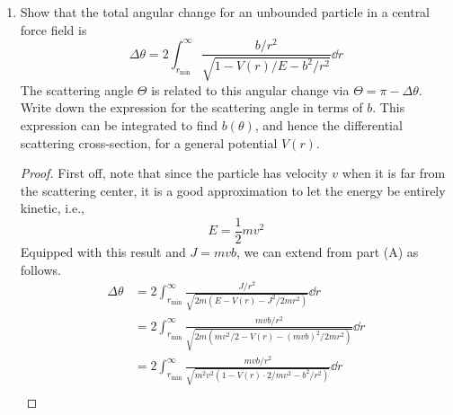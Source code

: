 \documentclass[../psets.tex]{subfiles}
\begin{document}
\begin{enumerate}
\begin{enumerate}
\begin{proof}
            At this point, we know that the particle's linear momentum $p=mv$, where $m$ is the mass of the particle. Additionally, since the particle is far from the scattering center, it is a good approximation to let $\vec{p}$ lie parallel to the hyperbolic trajectory's directrix (i.e., the linear path the particle would take were the scattering center not there). The position vector $\vec{r}$ then intersects $\vec{p}$ at the particle's location, forming an angle $\phi$. It follows by the definition of angular momentum that $J=rp\sin\phi$. But since $b$ is the distance from the scattering center to the directrix, trigonometry shows that $r\sin\phi=b$. Thus, returning the substitutions $p=mv$ and $b=r\sin\phi$, we obtain
            \begin{equation*}
                J = mvb
            \end{equation*}
            as desired.
        \end{proof}
        \item Show that the total angular change for an unbounded particle in a central force field is
        \begin{equation*}
            \Delta\theta = 2\int_{r_\text{min}}^\infty\frac{b/r^2}{\sqrt{1-V(r)/E-b^2/r^2}}\dd{r}
        \end{equation*}
        The scattering angle $\Theta$ is related to this angular change via $\Theta=\pi-\Delta\theta$. Write down the expression for the scattering angle in terms of $b$. This expression can be integrated to find $b(\theta)$, and hence the differential scattering cross-section, for a general potential $V(r)$.
        \begin{proof}
            First off, note that since the particle has velocity $v$ when it is far from the scattering center, it is a good approximation to let the energy be entirely kinetic, i.e.,
            \begin{equation*}
                E = \frac{1}{2}mv^2
            \end{equation*}
            Equipped with this result and $J=mvb$, we can extend from part (A) as follows.
            \begin{align*}
                \Delta\theta &= 2\int_{r_\text{min}}^\infty\frac{J/r^2}{\sqrt{2m(E-V(r)-J^2/2mr^2)}}\dd{r}\\
                &= 2\int_{r_\text{min}}^\infty\frac{mvb/r^2}{\sqrt{2m(mv^2/2-V(r)-(mvb)^2/2mr^2)}}\dd{r}\\
                &= 2\int_{r_\text{min}}^\infty\frac{mvb/r^2}{\sqrt{m^2v^2(1-V(r)\cdot 2/mv^2-b^2/r^2)}}\dd{r}\\

\end{align*}
\end{proof}
\end{enumerate}
\end{enumerate}
\end{document}
